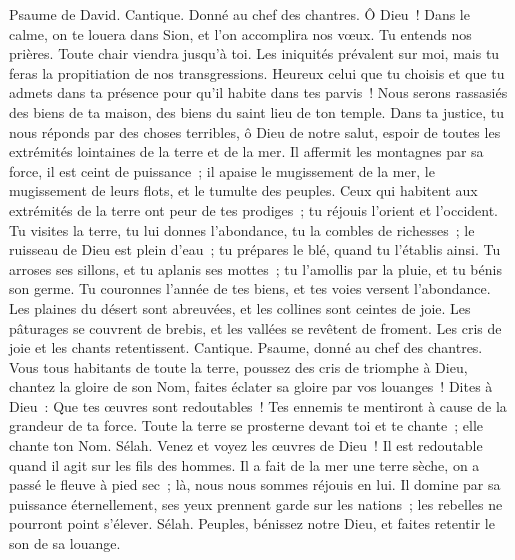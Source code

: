 \begin{multicols}{2}
\VerseOne{}Psaume de David. Cantique. Donné au chef des chantres.
Ô Dieu~! Dans le calme, on te louera dans Sion, et l'on accomplira nos vœux.
Tu entends nos prières. Toute chair viendra jusqu'à toi.
Les iniquités prévalent sur moi, mais tu feras la propitiation de nos transgressions.
Heureux celui que tu choisis et que tu admets dans ta présence pour qu'il habite dans tes parvis~! Nous serons rassasiés des biens de ta maison, des biens du saint lieu de ton temple.
Dans ta justice, tu nous réponds par des choses terribles, ô Dieu de notre salut, espoir de toutes les extrémités lointaines de la terre et de la mer.
Il affermit les montagnes par sa force, il est ceint de puissance~;
il apaise le mugissement de la mer, le mugissement de leurs flots, et le tumulte des peuples.
Ceux qui habitent aux extrémités de la terre ont peur de tes prodiges~; tu réjouis l'orient et l'occident.
Tu visites la terre, tu lui donnes l'abondance, tu la combles de richesses~; le ruisseau de Dieu est plein d'eau~; tu prépares le blé, quand tu l'établis ainsi.
Tu arroses ses sillons, et tu aplanis ses mottes~; tu l'amollis par la pluie, et tu bénis son germe.
Tu couronnes l'année de tes biens, et tes voies versent l'abondance.
Les plaines du désert sont abreuvées, et les collines sont ceintes de joie.
Les pâturages se couvrent de brebis, et les vallées se revêtent de froment. Les cris de joie et les chants retentissent.
\VerseOne{}Cantique. Psaume, donné au chef des chantres. Vous tous habitants de toute la terre, poussez des cris de triomphe à Dieu,
chantez la gloire de son Nom, faites éclater sa gloire par vos louanges~!
Dites à Dieu~: Que tes œuvres sont redoutables~! Tes ennemis te mentiront à cause de la grandeur de ta force.
Toute la terre se prosterne devant toi et te chante~; elle chante ton Nom. Sélah.
Venez et voyez les œuvres de Dieu~! Il est redoutable quand il agit sur les fils des hommes.
Il a fait de la mer une terre sèche, on a passé le fleuve à pied sec~; là, nous nous sommes réjouis en lui.
Il domine par sa puissance éternellement, ses yeux prennent garde sur les nations~; les rebelles ne pourront point s'élever. Sélah.
Peuples, bénissez notre Dieu, et faites retentir le son de sa louange.

\end{multicols}
